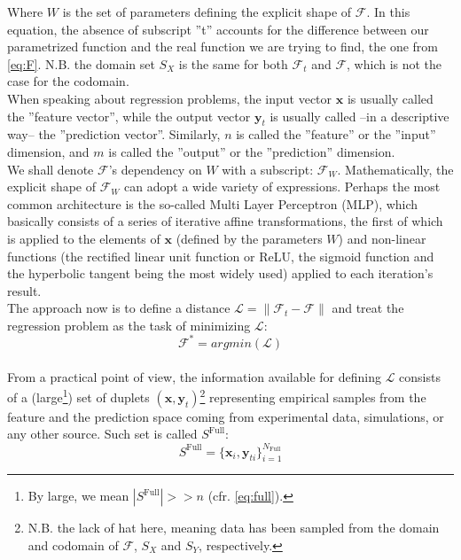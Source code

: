 Where $W$ is the set of parameters defining the explicit shape of $\mathcal{{F}}$. In this equation, the absence of subscript ''t'' accounts for the difference between our parametrized function and the real function we are trying to find, the one from \cref{eq:F}. N.B. the domain set $S_X$ is the same for both $\mathcal{F}_t$ and $\mathcal{F}$, which is not the case for the codomain.\\
%
\indent When speaking about regression problems, the input vector $\mathbf{x}$ is usually called the ''feature vector'', while the output vector $\mathbf{y}_t$ is usually called --in a descriptive way-- the ''prediction vector''. Similarly, $n$ is called the ''feature'' or the ''input'' dimension, and $m$ is called the ''output'' or the ''prediction'' dimension.\\
%
\indent We shall denote $\mathcal{{F}}$'s dependency on $W$ with a subscript: $\mathcal{{F}}_W$. Mathematically, the explicit shape of $\mathcal{{F}}_W$ can adopt a wide variety of expressions. Perhaps the most common architecture is the so-called Multi Layer Perceptron (MLP)\cite{Marsland2015Machine}, which basically consists of a series of iterative affine transformations, the first of which is applied to the elements of $\mathbf{x}$ (defined by the parameters $W$) and non-linear functions (the rectified linear unit function or ReLU, the sigmoid function and the hyperbolic tangent being the most widely used) applied to each iteration's result.\\
%
\indent The approach now is to define a distance $\mathcal{L}=\|\mathcal{F}_t-\mathcal{{F}}\|$ and treat the regression problem as the task of minimizing $\mathcal{L}$:
\begin{equation}\label{eq:Fargmin}
	\mathcal{{F}}^*=argmin(\mathcal{L})
\end{equation}\\
%
\indent From a practical point of view, the information available for defining $\mathcal{L}$ consists of a (large\footnote{By large, we mean $\left|S^\text{Full}\right|>>n$ (cfr. \cref{eq:full}).}) set of duplets $(\mathbf{x},\mathbf{y}_t)$\footnote{N.B. the lack of hat here, meaning data has been sampled from the domain and codomain of $\mathcal{F}$, $S_X$ and $S_Y$, respectively.} representing empirical samples from the feature and the prediction space coming from experimental data, simulations, or any other source. Such set is called $S^\text{Full}$:
\begin{equation}\label{eq:full}
	S^\text{Full}=\{\mathbf{x}_i,\mathbf{y}_{ti}\}_{i=1}^{N_{\text{Full}}}
\end{equation}

